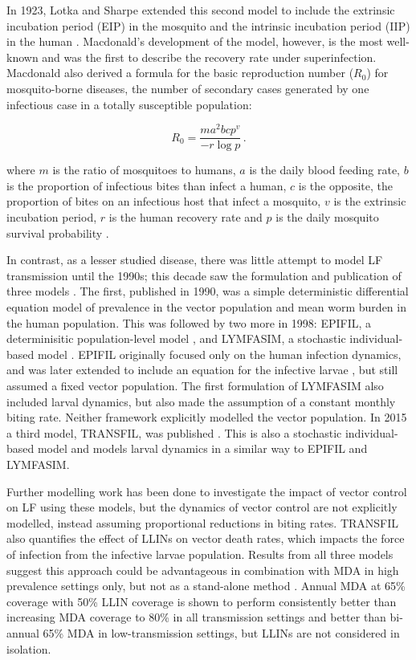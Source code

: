 In 1923, Lotka and Sharpe extended this second model to include the extrinsic incubation period (EIP) in the mosquito and the intrinsic incubation period (IIP) in the human \cite{Lotka1923}. Macdonald's development of the model, however, is the most well-known and was the first to describe the recovery rate under superinfection. Macdonald also derived a formula for the basic reproduction number ($R_0$) for mosquito-borne diseases, the number of secondary cases generated by one infectious case in a totally susceptible population:

\begin{equation}
    R_0 = \frac{m a^2 b c p^v}{-r\log{p}}\,.
\end{equation}

where $m$ is the ratio of mosquitoes to humans, $a$ is the daily blood feeding rate, $b$ is the proportion of infectious bites than infect a human, $c$ is the opposite, the proportion of bites on an infectious host that infect a mosquito, $v$ is the extrinsic incubation period, $r$ is the human recovery rate and $p$ is the daily mosquito survival probability \cite{Macdonald1957}. 

In contrast, as a lesser studied disease, there was little attempt to model LF transmission until the 1990s; this decade saw the formulation and publication of three models \cite{Rochet1990,Chan1998,Plaisier1998}. The first, published in 1990, was a simple deterministic differential equation model \cite{Rochet1990} of prevalence in the vector population and mean worm burden in the human population. This was followed by two more in 1998: EPIFIL, a determinisitic population-level model \cite{Chan1998}, and LYMFASIM, a stochastic individual-based model \cite{Plaisier1998}. EPIFIL originally focused only on the human infection dynamics, and was later extended to include an equation for the infective larvae \cite{Norman2000_epifil}, but still assumed a fixed vector population. The first formulation of LYMFASIM also included larval dynamics, but also made the assumption of a constant monthly biting rate. Neither framework explicitly modelled the vector population. In 2015 a third model, TRANSFIL, was published \cite{irvine2015}. This is also a stochastic individual-based model and models larval dynamics in a similar way to EPIFIL and LYMFASIM.

Further modelling work has been done to investigate the impact of vector control on LF using these models, but the dynamics of vector control are not explicitly modelled, instead assuming proportional reductions in biting rates. TRANSFIL also quantifies the effect of LLINs on vector death rates, which impacts the force of infection from the infective larvae population. Results from all three models suggest this approach could be advantageous in combination with MDA in high prevalence settings only, but not as a stand-alone method \cite{Irvine2017_Tripledrug}. Annual MDA at 65\% coverage with 50\% LLIN coverage is shown to perform consistently better than increasing MDA coverage to 80\% in all transmission settings and better than bi-annual 65\% MDA in low-transmission settings, but LLINs are not considered in isolation.

